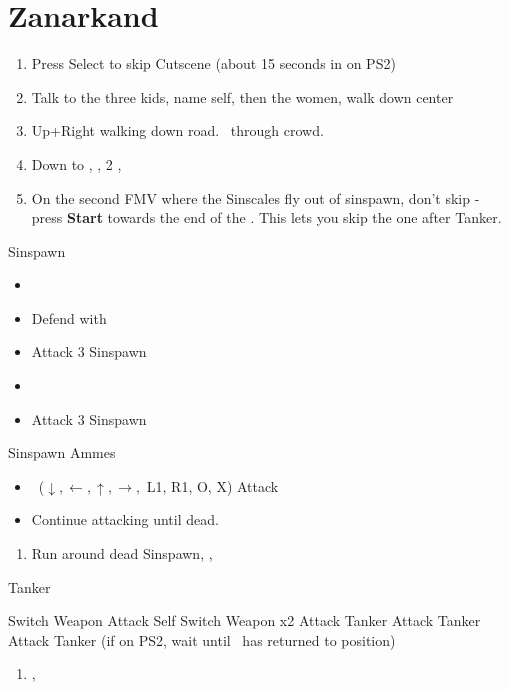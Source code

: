 \chapter{Zanarkand}

\begin{enumerate}
    \item Press Select to skip Cutscene (about 15 seconds in on PS2)
    \item Talk to the three kids, name self, then the women, walk down center
    \item Up+Right walking down road. \sd\ through crowd. \skippablefmv[2:30]
    \item Down to \auron, \sd, 2 \skippablefmv[2:30], \sd
    \item On the second FMV where the Sinscales fly out of sinspawn, don't skip - press \textbf{Start} towards the end of the \fmv. This lets you skip the one after Tanker.
\end{enumerate}
\begin{battle}{Sinspawn}
    \begin{itemize}
        \item \sd
        \item Defend with \tidus
        \item Attack 3 Sinspawn
        \item \sd
        \item Attack 3 Sinspawn
    \end{itemize}
\end{battle}
\begin{battle}[2400]{Sinspawn Ammes}
    \begin{itemize}
        \item \sd
        \auronf \od\ ($\downarrow, \leftarrow, \uparrow, \rightarrow,$ L1, R1, O, X)
        \tidusf Attack
        \tidusf \od
        \item Continue attacking until dead.
    \end{itemize}
\end{battle}
\begin{enumerate}[resume]
    \item Run around dead Sinspawn, \save, \sd
\end{enumerate}
\begin{battle}[1000]{Tanker}
    \begin{itemize}
        \tidusf Switch Weapon
        \auronf Attack Self
        \tidusf Switch Weapon x2
        \tidusf Attack Tanker
        \auronf Attack Tanker
        \tidusf Attack Tanker (if on PS2, wait until \auron\ has returned to position)
    \end{itemize}
\end{battle}
\begin{enumerate}[resume]
    \item \cs[2:00], \skippablefmv
\end{enumerate}